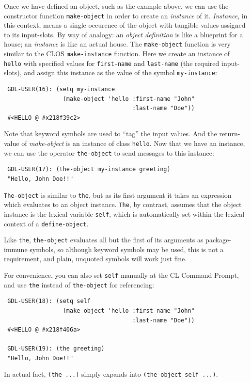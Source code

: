 \documentclass [11pt]{book}
\begin{document}
Once we have defined an object, such as the example above, we can use
the constructor function \texttt{make-object} in order to create an \emph{instance} of it. \emph{Instance}, in this context, means a single occurence of the object with
tangible values assigned to its input-slots. By way of analogy: an \emph{object definition} is like a blueprint for a house; an \emph{instance} is like an actual house. The \texttt{make-object} function is very similar to the CLOS \texttt{make-instance} function. Here we create an instance of \texttt{hello} with specified values for \texttt{first-name} and \texttt{last-name} (the required input-slots), and assign this instance as the value of the symbol \texttt{my-instance}:

\begin{verbatim}
 GDL-USER(16): (setq my-instance
                 (make-object 'hello :first-name "John" 
                                     :last-name "Doe"))
 #<HELLO @ #x218f39c2>
\end{verbatim}Note that keyword symbols are used to ``tag'' the input values. And the return-value of \emph{make-object} is an instance of class \texttt{hello}. Now that we have an instance, we can use the operator \texttt{the-object} to send messages to this instance:

\begin{verbatim}
 GDL-USER(17): (the-object my-instance greeting)
 "Hello, John Doe!!"
\end{verbatim}\texttt{The-object} is similar to \texttt{the}, but as its first argument it takes an expression which evaluates to an
object instance. \texttt{The}, by contrast, assumes that the object instance is the lexical variable \texttt{self}, which is automatically set within the lexical context of a \texttt{define-object}.

Like \texttt{the}, \texttt{the-object} evaluates all but the first of its arguments as package-immune symbols,
so although keyword symbols may be used, this is not a requirement, and plain,
unquoted symbols will work just fine.

For convenience, you can also set \texttt{self} manually at the CL Command Prompt, and use \texttt{the} instead of \texttt{the-object} for referencing:

\begin{verbatim}
 GDL-USER(18): (setq self 
                 (make-object 'hello :first-name "John" 
                                     :last-name "Doe"))
 #<HELLO @ #x218f406a>

 GDL-USER(19): (the greeting)
 "Hello, John Doe!!"
\end{verbatim}In actual fact, \texttt{(the ...)} simply expands into \texttt{(the-object self ...)}.
\end{document}
